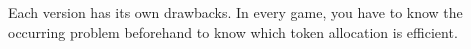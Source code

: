   Each version has its own drawbacks. In every game, you have to know the occurring problem beforehand to know which token allocation is efficient.





